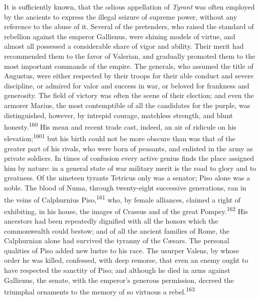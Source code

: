 
It is sufficiently known, that the odious appellation of \textit{Tyrant}
was often employed by the ancients to express the illegal seizure
of supreme power, without any reference to the abuse of it.
Several of the pretenders, who raised the standard of rebellion
against the emperor Gallienus, were shining models of virtue, and
almost all possessed a considerable share of vigor and ability.
Their merit had recommended them to the favor of Valerian, and
gradually promoted them to the most important commands of the
empire. The generals, who assumed the title of Augustus, were
either respected by their troops for their able conduct and
severe discipline, or admired for valor and success in war, or
beloved for frankness and generosity. The field of victory was
often the scene of their election; and even the armorer Marius,
the most contemptible of all the candidates for the purple, was
distinguished, however, by intrepid courage, matchless strength,
and blunt honesty.\textsuperscript{160} His mean and recent trade cast, indeed, an
air of ridicule on his elevation;\textsuperscript{1601} but his birth could not be
more obscure than was that of the greater part of his rivals, who
were born of peasants, and enlisted in the army as private
soldiers. In times of confusion every active genius finds the
place assigned him by nature: in a general state of war military
merit is the road to glory and to greatness. Of the nineteen
tyrants Tetricus only was a senator; Piso alone was a noble. The
blood of Numa, through twenty-eight successive generations, ran
in the veins of Calphurnius Piso,\textsuperscript{161} who, by female alliances,
claimed a right of exhibiting, in his house, the images of
Crassus and of the great Pompey.\textsuperscript{162} His ancestors had been
repeatedly dignified with all the honors which the commonwealth
could bestow; and of all the ancient families of Rome, the
Calphurnian alone had survived the tyranny of the Cæsars. The
personal qualities of Piso added new lustre to his race. The
usurper Valens, by whose order he was killed, confessed, with
deep remorse, that even an enemy ought to have respected the
sanctity of Piso; and although he died in arms against Gallienus,
the senate, with the emperor’s generous permission, decreed the
triumphal ornaments to the memory of so virtuous a rebel.\textsuperscript{163}


